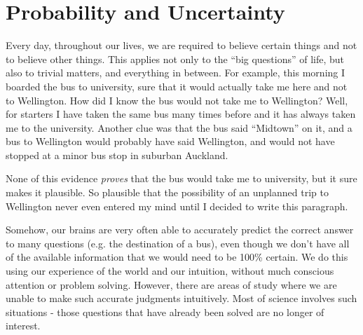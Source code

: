 \chapter{Probability and Uncertainty}
Every day, throughout our lives, we are required 
to believe certain things and not to believe other things. This applies not
only to the ``big questions'' of life, but also to trivial matters, and 
everything in between. For example, this morning I boarded the bus to 
university, sure that it would actually take me here and not to Wellington.
How did I know the bus would not take me to Wellington? Well, for starters
I have taken the same bus many times before and it has always taken me to the
university. Another clue was that the bus said ``Midtown'' on it, and a bus
to Wellington would probably have said Wellington, and would not have stopped
at a minor bus stop in suburban Auckland.

None of this evidence {\it proves} that the bus would take me to university,
but it sure makes it plausible. So plausible that the possibility of an
unplanned trip to Wellington never even entered my mind until I decided to
write this paragraph.

Somehow, our brains are very often able to accurately predict the correct answer
to many questions (e.g. the destination of a bus), even though we don't have
all of the available information that we would need to be 100\% certain.
We do this using our experience of the world and our intuition, without much
conscious attention or problem solving. However, there are areas of study where
we are unable to make such accurate judgments intuitively. Most of science involves
such situations - those questions that have already been solved are
no longer of interest.
